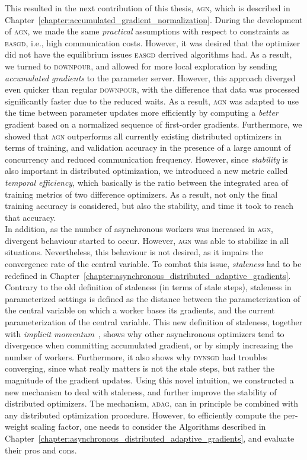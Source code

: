 This resulted in the next contribution of this thesis, \textsc{agn}, which is described in Chapter~\ref{chapter:accumulated_gradient_normalization}. During the development of \textsc{agn}, we made the same \emph{practical} assumptions with respect to constraints as \textsc{easgd}, i.e., high communication costs. However, it was desired that the optimizer did not have the equilibrium issues \textsc{easgd} derrived algorithms had. As a result, we turned to \textsc{downpour}, and allowed for more local exploration by sending \emph{accumulated gradients} to the parameter server. However, this approach diverged even quicker than regular \textsc{downpour}, with the difference that data was processed significantly faster due to the reduced waits. As a result, \textsc{agn} was adapted to use the time between parameter updates more efficiently by computing a \emph{better} gradient based on a normalized sequence of first-order gradients. Furthermore, we showed that \textsc{agn} outperforms all currently existing distributed optimizers in terms of training, and validation accuracy in the presence of a large amount of concurrency and reduced communication frequency. However, since \emph{stability} is also important in distributed optimization, we introduced a new metric called \emph{temporal efficiency}, which basically is the ratio between the integrated area of training metrics of two difference optimizers. As a result, not only the final training accuracy is considered, but also the stability, and time it took to reach that accuracy.\\

In addition, as the number of asynchronous workers was increased in \textsc{agn}, divergent behaviour started to occur. However, \textsc{agn} was able to stabilize in all situations. Nevertheless, this behaviour is not desired, as it impairs the convergence rate of the central variable. To combat this issue, \emph{staleness} had to be redefined in Chapter~\ref{chapter:asynchronous_distributed_adaptive_gradients}. Contrary to the old definition of staleness (in terms of stale steps), staleness in parameterized settings is defined as the distance between the parameterization of the central variable on which a worker bases its gradients, and the current parameterization of the central variable. This new definition of staleness, together with \emph{implicit momentum}~\cite{implicitmomentum}, shows why other asynchronous optimizers tend to divergence when committing accumulated gradient, or by simply increasing the number of workers. Furthermore, it also shows why \textsc{dynsgd} had troubles converging, since what really matters is not the stale steps, but rather the magnitude of the gradient updates. Using this novel intuition, we constructed a new mechanism to deal with staleness, and further improve the stability of distributed optimizers. The mechanism, \textsc{adag}, can in principle be combined with any distributed optimization procedure. However, to efficiently compute the per-weight scaling factor, one needs to consider the Algorithms described in Chapter~\ref{chapter:asynchronous_distributed_adaptive_gradients}, and evaluate their pros and cons.\\

